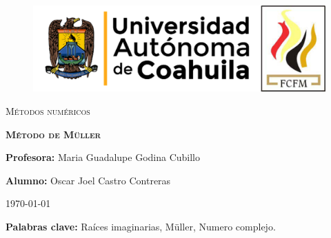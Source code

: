 \documentclass[12pt]{article}
\begin{document}
		
		\begin{titlepage}
		
			\centering
			{\bfseries
			\begin{figure}[h!]
				\centering
				\includegraphics[width=\linewidth]{Nom_UAdeC_FCFM.png} 				
			\end{figure}
			\par}
			\vspace{2cm}
			{\scshape\LARGE Métodos numéricos \par}
			\vspace{3cm}
			{\scshape\Huge \textbf{Método de Müller} \par}
			\vfill
			{\LARGE \textbf{Profesora:} Maria Guadalupe Godina Cubillo \par}
			\vspace{3cm}
			{\LARGE \textbf{Alumno:} Oscar Joel Castro Contreras \par}
			\vfill
			{\Large \today \par}
			\thispagestyle{empty}
			
		\end{titlepage}
	
		\newpage

		\begin{abstract}
			\noindent En este reporte explico un poco de los métodos que existen para encontrar las raíces de cualquier 
			polinomio o función que tenga raíces, y en específico explico, qué es, en que consiste y cuales son las 
			limitaciones del método de Müller para encontrar raíces reales y imaginarias.
		\end{abstract}

		\textbf{Palabras clave:} Raíces imaginarias, Müller, Numero complejo.
\end{document}
